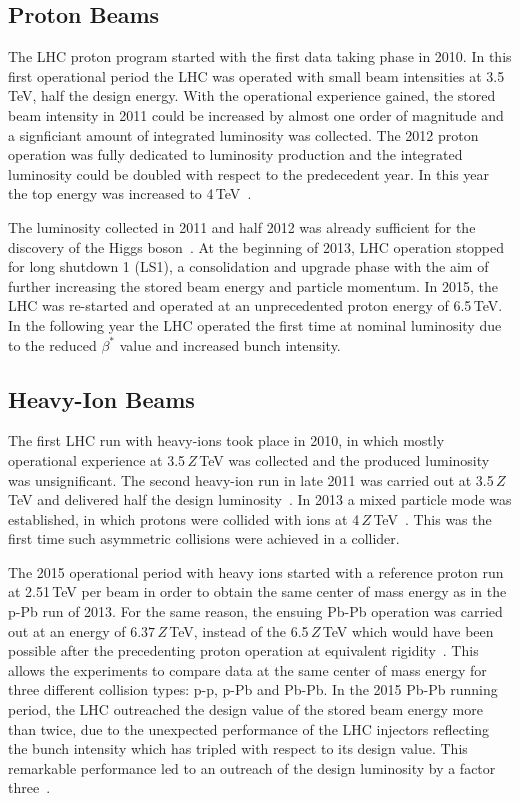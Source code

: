 \subsection{Proton Beams}

The LHC proton program started with the first data taking phase in 2010. In this first operational period the LHC was operated with small beam intensities at 3.5\,TeV, half the design energy. With the operational experience gained, the stored beam intensity in 2011 could be increased by almost one order of magnitude and a signficiant amount of integrated luminosity was collected. The 2012 proton operation was fully dedicated to luminosity production and the integrated luminosity could be doubled with respect to the predecedent year. In this year the top energy was increased to 4\,TeV~\cite{IPAC16:WEOCA01}.

The luminosity collected in 2011 and half 2012 was already sufficient for the discovery of the Higgs boson~\cite{}. At the beginning of 2013, LHC operation stopped for long shutdown 1 (LS1), a consolidation and upgrade phase with the aim of further increasing the stored beam energy and particle momentum. In 2015, the LHC was re-started and operated at an unprecedented proton energy of 6.5\,TeV. In the following year the LHC operated the first time at nominal luminosity due to the reduced $\beta^*$ value and increased bunch intensity.

\subsection{Heavy-Ion Beams}

The first LHC run with heavy-ions took place in 2010, in which mostly operational experience at 3.5\,$Z\,$TeV was collected and the produced luminosity was unsignificant. The second heavy-ion run in late 2011 was carried out at 3.5\,$Z$\,TeV and delivered half the design luminosity~\cite{PbPbref01}. In 2013 a mixed particle mode was established, in which protons were collided with \lead ions at 4$\,Z\,$TeV~\cite{pPbref01}. This was the first time such asymmetric collisions were achieved in a collider.

The 2015 operational period with heavy ions started with a reference proton run at 2.51$\,$TeV per beam in order to obtain the same center of mass energy as in the p-Pb run of 2013. For the same reason, the ensuing Pb-Pb operation was carried out at an energy of $6.37\,Z\,$TeV, instead of the 6.5$\,Z\,$TeV which would have been possible after the precedenting proton operation at equivalent rigidity~\cite{IPAC16:TUPMW027}. This allows the experiments to compare data at the same center of mass energy for three different collision types: p-p, p-Pb and Pb-Pb. In the 2015 Pb-Pb running period, the LHC outreached the design value of the stored \lead beam energy more than twice, due to the unexpected performance of the LHC injectors reflecting the bunch intensity which has tripled with respect to its design value. This remarkable performance led to an outreach of the design luminosity by a factor three~\cite{IPAC16:TUPMW027}.


